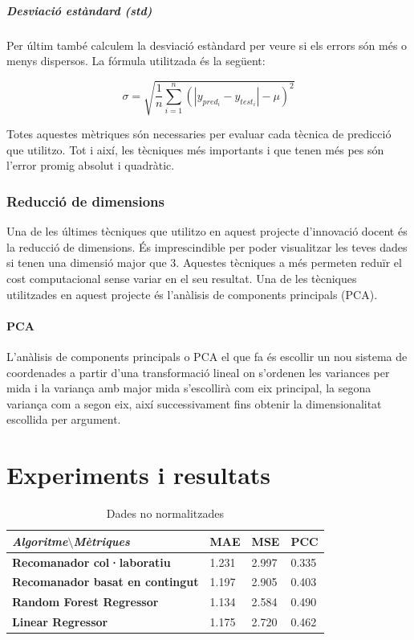 \documentclass[12pt,a4paper,catalan]{article}
\begin{document}
\subparagraph{Desviació estàndard (std)}
Per últim també calculem la desviació estàndard per veure si els errors són més o menys dispersos. La fórmula utilitzada és la següent:

$$ \sigma = \sqrt{ \frac{1}{n} \sum_{i=1}^n (\left| y_{pred_i}-y_{test_i}\right| - \mu)^2 } $$

Totes aquestes mètriques són necessaries per evaluar cada tècnica de predicció que utilitzo. Tot i així, les tècniques més importants i que tenen més pes són l'error promig absolut i quadràtic.

\subsubsection{Reducció de dimensions}
Una de les últimes tècniques que utilitzo en aquest projecte d'innovació docent és la reducció de dimensions. És imprescindible per poder visualitzar les teves dades si tenen una dimensió major que 3. Aquestes tècniques a més permeten reduïr el cost computacional sense variar en el seu resultat. Una de les tècniques utilitzades en aquest projecte és l'anàlisis de components principals (PCA).

\paragraph{PCA}
L'anàlisis de components principals o PCA el que fa és escollir un nou sistema de coordenades a partir d'una transformació lineal on s'ordenen les variances per mida i la variança amb major mida s'escollirà com eix principal, la segona variança com a segon eix, així successivament fins obtenir la dimensionalitat escollida per argument.

\newpage

\section{Experiments i resultats}

\begin{table}[h]
\centering
\begin{tabular}{@{}llll@{}}
\toprule
\textit{\textbf{Algoritme$\setminus$Mètriques}}   & \textbf{MAE} & \textbf{MSE} & \textbf{PCC} \\ \midrule
\textbf{Recomanador col·laboratiu}      & 1.231        & 2.997        & 0.335        \\
\textbf{Recomanador basat en contingut} & 1.197        & 2.905        & 0.403        \\
\textbf{Random Forest Regressor}        & 1.134        & 2.584        & 0.490        \\
\textbf{Linear Regressor}               & 1.175        & 2.720        & 0.462        \\ \bottomrule
\end{tabular}
\caption{Dades no normalitzades}
\end{table}
\end{document}
